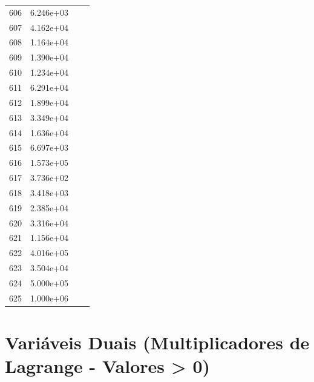 \documentclass[12pt]{article}
\begin{document}
\begin{longtable}{@{}cccc@{}}
606 & 6.246e+03 &  &  \\
607 & 4.162e+04 &  &  \\
608 & 1.164e+04 &  &  \\
609 & 1.390e+04 &  &  \\
610 & 1.234e+04 &  &  \\
611 & 6.291e+04 &  &  \\
612 & 1.899e+04 &  &  \\
613 & 3.349e+04 &  &  \\
614 & 1.636e+04 &  &  \\
615 & 6.697e+03 &  &  \\
616 & 1.573e+05 &  &  \\
617 & 3.736e+02 &  &  \\
618 & 3.418e+03 &  &  \\
619 & 2.385e+04 &  &  \\
620 & 3.316e+04 &  &  \\
621 & 1.156e+04 &  &  \\
622 & 4.016e+05 &  &  \\
623 & 3.504e+04 &  &  \\
624 & 5.000e+05 &  &  \\
625 & 1.000e+06 &  &  \\

\bottomrule
\end{longtable}


\section{Variáveis Duais (Multiplicadores de Lagrange - Valores > 0)}
\end{document}
